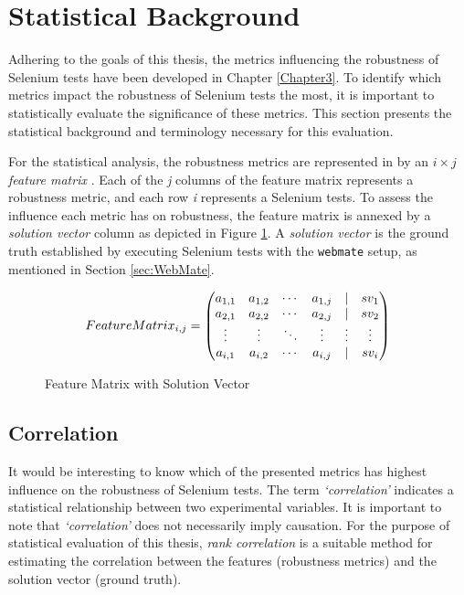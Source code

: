 
\section{Statistical Background}
\label{sec:Statistical}
Adhering to the goals of this thesis, the metrics influencing the robustness of Selenium tests have been developed in Chapter \ref{Chapter3}. To identify which metrics impact the robustness of Selenium tests the most, it is important to statistically evaluate the significance of these metrics. This section presents the statistical background and terminology necessary for this evaluation.

For the statistical analysis, the robustness metrics are represented in by an $i\times j$  \textit{feature matrix} \cite{li2005lasso}. Each of the \textit{j} columns of the feature matrix represents a robustness metric, and each row
\textit{i} represents a Selenium tests. To assess the influence each metric has on robustness, the feature matrix is annexed by a \textit{solution vector} column as depicted in Figure \ref{fig:featurematrix}. A \textit{solution vector} is the ground truth established by executing Selenium tests with the \texttt{webmate} setup, as mentioned in Section \ref{sec:WebMate}.

\begin{figure}[ht]
\[
Feature\smallskip Matrix_{i,j} = 
\begin{pmatrix}
  a_{1,1} & a_{1,2} & \cdots & a_{1,j} & | & \textit{$sv_{1}$}\\
  a_{2,1} & a_{2,2} & \cdots & a_{2,j} & | & \textit{$sv_{2}$}\\
  \vdots  & \vdots  & \ddots & \vdots  & \vdots & \vdots \\
  a_{i,1} & a_{i,2} & \cdots & a_{i,j} & | & \textit{$sv_{i}$}
\end{pmatrix}
\]
\caption{Feature Matrix with Solution Vector}
\label{fig:featurematrix}
\end{figure}

\subsection{Correlation}
It would be interesting to know which of the presented metrics has highest influence on the robustness of Selenium tests. The term \textit{`correlation'} indicates a statistical relationship between two experimental variables. It is important to note that \textit{`correlation'} does not necessarily imply causation. For the  purpose of statistical evaluation of this thesis, \textit{rank correlation} is a suitable method for estimating the correlation between the features (robustness metrics) and the solution vector (ground truth).

